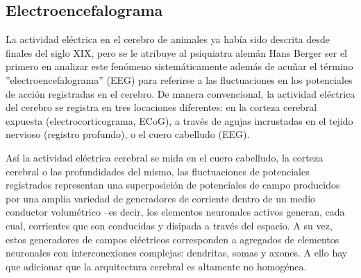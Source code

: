 
\subsection{Electroencefalograma}


La actividad el\'ectrica en el cerebro de animales ya hab\'ia sido descrita desde finales del
siglo XIX, pero se le atribuye al psiquiatra alem\'an Hans Berger ser el primero en analizar
este fen\'omeno sistem\'aticamente adem\'as de acu\~nar el t\'ermino ''electroencefalograma'' (EEG)
para referirse a las fluctuaciones en los potenciales de acci\'on registradas en el cerebro.
De manera convencional, la actividad el\'ectrica del cerebro 
se registra en tres locaciones diferentes: en la corteza cerebral
expuesta (electrocorticograma, ECoG), a trav\'es de agujas incrustadas en el tejido nervioso
(registro profundo), o el cuero cabelludo (EEG).


As\'i la actividad el\'ectrica cerebral se mida
en el cuero cabelludo, la corteza cerebral o las profundidades 
del mismo,
las fluctuaciones de potenciales registrados representan una superposici\'on
de potenciales de campo producidos por una amplia variedad de 
generadores de corriente dentro de un medio conductor volum\'etrico --es decir, los elementos
neuronales activos generan, cada cual, corrientes que son conducidas y disipada a 
trav\'es del espacio.
A su vez, estos generadores de campos el\'ectricos corresponden a agregados de elementos
neuronales con interconexiones complejas: dendritas, somas y axones.
A ello hay que adicionar que la arquitectura cerebral es altamente no homog\'enea.

